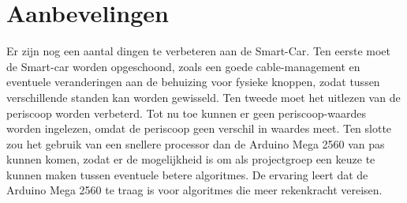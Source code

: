 \section{Aanbevelingen}
\begin{comment}
Er zijn nog veel dingen te verbeteren aan de \gls{Smart-Car}. Zo is de functionaliteit van de fysieke controller en het algoritme nog niet optimaal en kan de bekabeling nog veel beter. 
Aanbevolen wordt daarom, om in de toekomst verder te gaan met het ontwikkelen van de fysieke controller. Daarnaast is het autonome gedeelte van de \gls{Smart-Car} doormiddel van een algoritme gemaakt, die nog erg weinig omvat. Dit kan nog veel beter en verder uitgewerkt worden, onder andere door verdere toepassing van \gls{SLAM} met behulp van de 9 axis sensor. Verder kan de bekabeling heel wat netter en overzichtelijker gemaakt worden. Met behulp van speciaal ontworpen printplaatjes kan ook het aantal draadjes en de lengtes hiervan verkleind worden. 
\end{comment}

Er zijn nog een aantal dingen te verbeteren aan de \gls{Smart-Car}. Ten eerste moet de Smart-car worden opgeschoond, zoals een goede cable-management en eventuele veranderingen aan de behuizing voor fysieke knoppen, zodat tussen verschillende standen kan worden gewisseld. Ten tweede moet het uitlezen van de periscoop worden verbeterd. Tot nu toe kunnen er geen periscoop-waardes worden ingelezen, omdat de periscoop geen verschil in waardes meet. Ten slotte zou het gebruik van een snellere processor dan de Arduino Mega 2560 van pas kunnen komen, zodat er de mogelijkheid is om als projectgroep een keuze te kunnen maken tussen eventuele betere algoritmes. De ervaring leert dat de Arduino Mega 2560 te traag is voor algoritmes die meer rekenkracht vereisen.